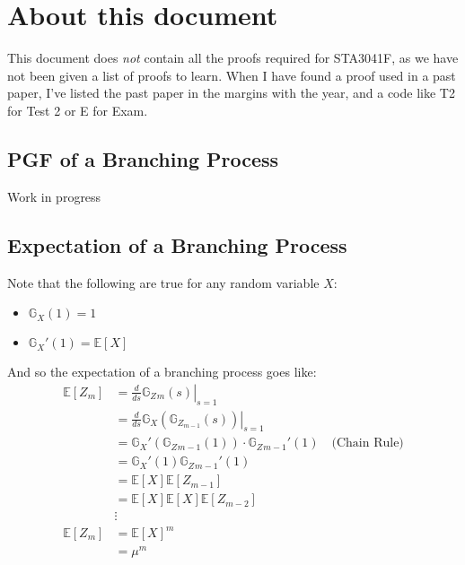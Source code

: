 \documentclass[12pt]{report}
\begin{document}
\maketitle
\tableofcontents
\section{About this document}
This document does \textit{not} contain all the proofs required for STA3041F,
as we have not been given a list of proofs to learn. When I have found a proof
used in a past paper, I've listed the past paper in the margins with the year,
and a code like T2 for Test 2 or E for Exam.
\subsection{PGF of a Branching Process}
Work in progress
\subsection{Expectation of a Branching Process}
Note that the following are true for any random variable $X$:
\begin{itemize}
    \item $ \mathbb{G}_{X}(1) = 1 $ 
    \item $ \mathbb{G}_{X}'(1) = \mathbb{E}\left[X\right]$ 
\end{itemize}
And so the expectation of a branching process goes like:
\begin{equation*}
    \begin{aligned}
        \mathbb{E}\left[Z_{m}\right] &= \left.\frac{d}{ds} \mathbb{G}_Z{_{m}}(s)
        \right|_{s=1}  \\
            &= \left.\frac{d}{ds}\mathbb{G}_X\left(\mathbb{G}_{Z_{m-1}}(s) \right)
            \right\vert_{s=1}\\
            &= \mathbb{G}_X'\left( \mathbb{G}_Z{_{m-1}}(1) \right)
            \cdot \mathbb{G}_Z{_{m-1}}'(1) \quad\text{(Chain Rule)}\\
            &= \mathbb{G}_X'\left( 1 \right) \mathbb{G}_Z{_{m-1}}'(1)\\
            &= \mathbb{E}\left[ X \right]  \mathbb{E}\left[Z_{m-1}\right] \\
            &= \mathbb{E}\left[ X \right]  \mathbb{E}\left[X\right] \mathbb{E}\left[Z_{m-2}\right] \\
            &\vdots \\
        \mathbb{E}\left[Z_{m}\right] &= \mathbb{E}\left[ X \right]^{m} \\
            &= \mu^{m} \\
    \end{aligned}
\end{equation*}
    
\end{document}
